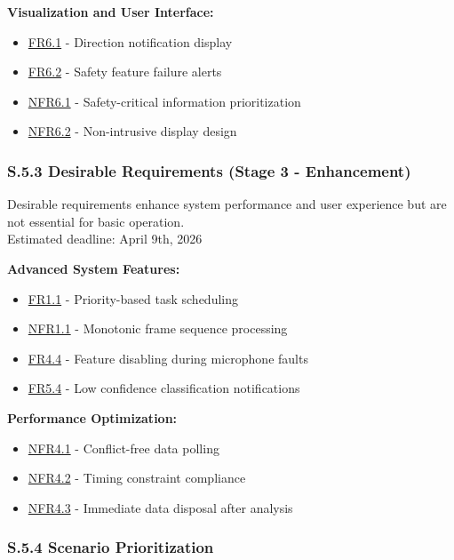 \documentclass[12pt]{article}
\theoremstyle{definition}
\begin{document}
\textbf{Visualization and User Interface:}
\begin{itemize}
    \item \hyperref[FR6_1]{FR6.1} - Direction notification display
    \item \hyperref[FR6_2]{FR6.2} - Safety feature failure alerts
    \item \hyperref[NFR6_1]{NFR6.1} - Safety-critical information prioritization
    \item \hyperref[NFR6_2]{NFR6.2} - Non-intrusive display design
\end{itemize}

\subsubsection{S.5.3 Desirable Requirements (Stage 3 - Enhancement)}

Desirable requirements enhance system performance and user experience but are
not essential for basic operation. \\
\newline
Estimated deadline: April 9th, 2026 \\
\newline

\textbf{Advanced System Features:}
\begin{itemize}
    \item \hyperref[FR1_1]{FR1.1} - Priority-based task scheduling
    \item \hyperref[NFR1_1]{NFR1.1} - Monotonic frame sequence processing
    \item \hyperref[FR4_4]{FR4.4} - Feature disabling during microphone faults
    \item \hyperref[FR5_4]{FR5.4} - Low confidence classification notifications
\end{itemize}

\textbf{Performance Optimization:}
\begin{itemize}
    \item \hyperref[NFR4_1]{NFR4.1} - Conflict-free data polling
    \item \hyperref[NFR4_2]{NFR4.2} - Timing constraint compliance
    \item \hyperref[NFR4_3]{NFR4.3} - Immediate data disposal after analysis
\end{itemize}

\subsubsection{S.5.4 Scenario Prioritization}
\end{document}
